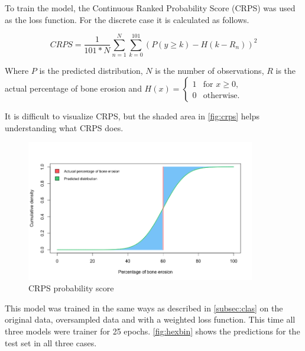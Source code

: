 \documentclass[12pt]{article}
\begin{document}
To train the model, the Continuous Ranked Probability Score (CRPS) was used as the loss function. For the discrete case it is calculated as follows. \cite{crps}

$$CRPS = \frac{1}{101 * N} \sum\limits_{n=1}^{N} \sum\limits_{k=0}^{101} (P(y \geq k) - H(k - R_n))^2$$

Where $P$ is the predicted distribution, $N$ is the number of observations, $R$ is the actual percentage of bone erosion and $H(x) = \begin{cases}
1 & \text{for $x \geq 0$,}\\
0 & \text{otherwise.}
\end{cases}$ \cite{crps}

It is difficult to visualize CRPS, but the shaded area in \autoref{fig:crps} helps understanding what CRPS does. \cite{crps}

\begin{figure}[ht]
\includegraphics[width=10cm]{crps}	
\caption{CRPS probability score}
\label{fig:crps}
\end{figure}

This model was trained in the same ways as described in \ref{subsec:clas} on the original data, oversampled data and with a weighted loss function. This time all three models were trainer for 25 epochs. \autoref{fig:hexbin} shows the predictions for the test set in all three cases.
\end{document}

